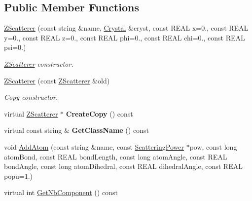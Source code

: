 \subsection*{Public Member Functions}
\begin{DoxyCompactItemize}
\item 
\mbox{\hyperlink{class_obj_cryst_1_1_z_scatterer_a2798124784744758620d1b7838b82af0}{Z\+Scatterer}} (const string \&name, \mbox{\hyperlink{class_obj_cryst_1_1_crystal}{Crystal}} \&cryst, const R\+E\+AL x=0., const R\+E\+AL y=0., const R\+E\+AL z=0., const R\+E\+AL phi=0., const R\+E\+AL chi=0., const R\+E\+AL psi=0.)
\begin{DoxyCompactList}\small\item\em \mbox{\hyperlink{class_obj_cryst_1_1_z_scatterer}{Z\+Scatterer}} constructor. \end{DoxyCompactList}\item 
\mbox{\hyperlink{class_obj_cryst_1_1_z_scatterer_aa371bd36d61fe7200753cd3a3e1076c8}{Z\+Scatterer}} (const \mbox{\hyperlink{class_obj_cryst_1_1_z_scatterer}{Z\+Scatterer}} \&old)
\begin{DoxyCompactList}\small\item\em Copy constructor. \end{DoxyCompactList}\item 
\mbox{\label{class_obj_cryst_1_1_z_scatterer_a2f4600a257a3396db8330dd6937f8339}} 
virtual \mbox{\hyperlink{class_obj_cryst_1_1_z_scatterer}{Z\+Scatterer}} $\ast$ {\bfseries Create\+Copy} () const
\item 
\mbox{\label{class_obj_cryst_1_1_z_scatterer_abb17bc654fe6dc270e42a244627ecd9c}} 
virtual const string \& {\bfseries Get\+Class\+Name} () const
\item 
void \mbox{\hyperlink{class_obj_cryst_1_1_z_scatterer_abe2114dff3bb1a170b4a0a855ba8bafa}{Add\+Atom}} (const string \&name, const \mbox{\hyperlink{class_obj_cryst_1_1_scattering_power}{Scattering\+Power}} $\ast$pow, const long atom\+Bond, const R\+E\+AL bond\+Length, const long atom\+Angle, const R\+E\+AL bond\+Angle, const long atom\+Dihedral, const R\+E\+AL dihedral\+Angle, const R\+E\+AL popu=1.)
\item 
\mbox{\label{class_obj_cryst_1_1_z_scatterer_a67bdd05594780d97001f74fa2d902909}} 
virtual int \mbox{\hyperlink{class_obj_cryst_1_1_z_scatterer_a67bdd05594780d97001f74fa2d902909}{Get\+Nb\+Component}} () const

\end{DoxyCompactItemize}
